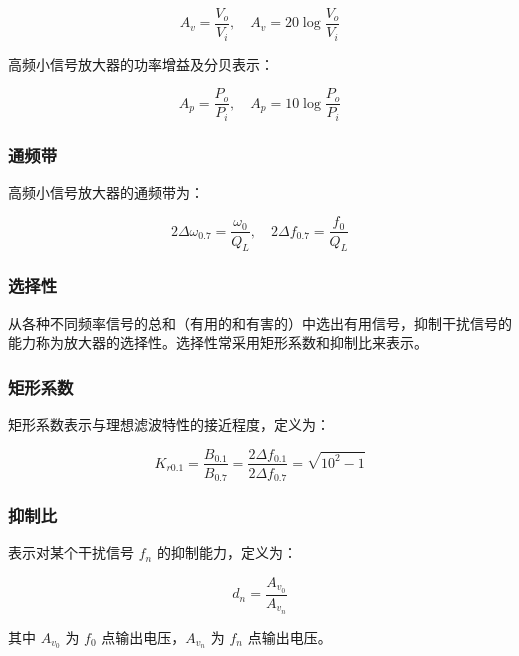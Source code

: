\begin{equation}
    A_v = \frac{V_o}{V_i}, \quad A_v = 20 \log{\frac{V_o}{V_i}}
\end{equation}

高频小信号放大器的功率增益及分贝表示：

\begin{equation}
    A_p = \frac{P_o}{P_i}, \quad A_p = 10 \log{\frac{P_o}{P_i}}
\end{equation}

\subsubsection{通频带}

高频小信号放大器的通频带为：

\begin{equation}
    2\Delta \omega_{0.7} = \frac{\omega_0}{Q_L}, \quad 2\Delta f_{0.7} = \frac{f_0}{Q_L}
\end{equation}

\subsubsection{选择性}

从各种不同频率信号的总和（有用的和有害的）中选出有用信号，抑制干扰信号的能力称为放大器的选择性。选择性常采用矩形系数和抑制比来表示。

\subsubsection{矩形系数}

矩形系数表示与理想滤波特性的接近程度，定义为：

\begin{equation}
    K_{r0.1} = \frac{B_{0.1}}{B_{0.7}} = \frac{2 \Delta f_{0.1}}{2 \Delta f_{0.7}} = \sqrt{10^2 - 1}
\end{equation}

\subsubsection{抑制比}

表示对某个干扰信号 $f_n$ 的抑制能力，定义为：

\begin{equation}
    d_n = \frac{A_{v_0}}{A_{v_n}}
\end{equation}

其中 $A_{v_0}$ 为 $f_0$ 点输出电压，$A_{v_n}$ 为 $f_n$ 点输出电压。

